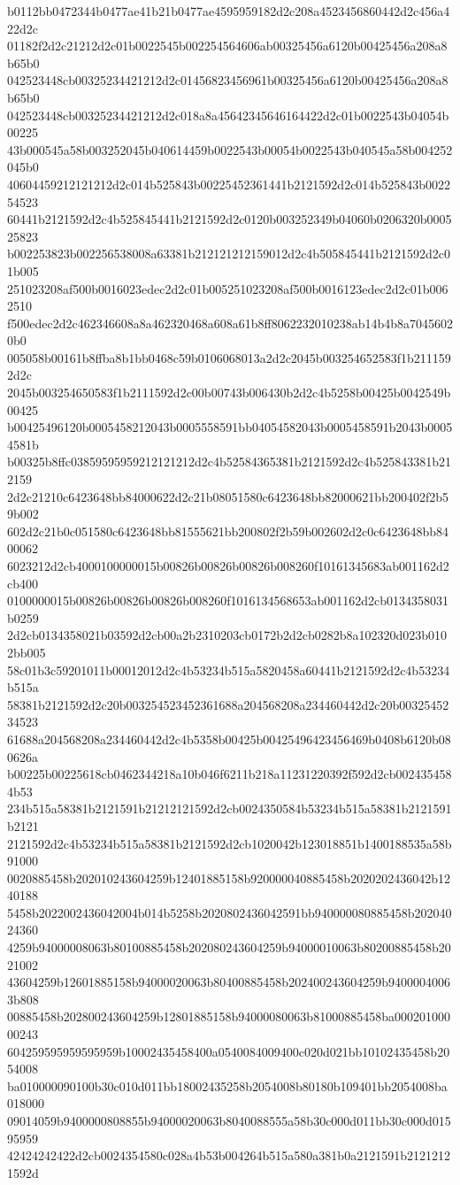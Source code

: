 b0112bb0472344b0477ae41b21b0477ae4595959182d2c208a4523456860442d2c456a422d2c
01182f2d2c21212d2c01b0022545b002254564606ab00325456a6120b00425456a208a8b65b0
042523448cb00325234421212d2c01456823456961b00325456a6120b00425456a208a8b65b0
042523448cb00325234421212d2c018a8a45642345646164422d2c01b0022543b04054b00225
43b000545a58b003252045b040614459b0022543b00054b0022543b040545a58b004252045b0
40604459212121212d2c014b525843b00225452361441b2121592d2c014b525843b002254523
60441b2121592d2c4b525845441b2121592d2c0120b003252349b04060b0206320b000525823
b002253823b002256538008a63381b212121212159012d2c4b505845441b2121592d2c01b005
251023208af500b0016023edec2d2c01b005251023208af500b0016123edec2d2c01b0062510
f500edec2d2c462346608a8a462320468a608a61b8ff8062232010238ab14b4b8a70456020b0
005058b00161b8ffba8b1bb0468c59b0106068013a2d2c2045b003254652583f1b2111592d2c
2045b003254650583f1b2111592d2c00b00743b006430b2d2c4b5258b00425b0042549b00425
b00425496120b0005458212043b0005558591bb04054582043b0005458591b2043b00054581b
b00325b8ffc03859595959212121212d2c4b52584365381b2121592d2c4b525843381b212159
2d2c21210c6423648bb84000622d2c21b08051580c6423648bb82000621bb200402f2b59b002
602d2c21b0c051580c6423648bb81555621bb200802f2b59b002602d2c0c6423648bb8400062
6023212d2cb4000100000015b00826b00826b00826b008260f10161345683ab001162d2cb400
0100000015b00826b00826b00826b008260f1016134568653ab001162d2cb0134358031b0259
2d2cb0134358021b03592d2cb00a2b2310203cb0172b2d2cb0282b8a102320d023b0102bb005
58c01b3c59201011b00012012d2c4b53234b515a5820458a60441b2121592d2c4b53234b515a
58381b2121592d2c20b003254523452361688a204568208a234460442d2c20b0032545234523
61688a204568208a234460442d2c4b5358b00425b00425496423456469b0408b6120b080626a
b00225b00225618cb0462344218a10b046f6211b218a11231220392f592d2cb0024354584b53
234b515a58381b2121591b21212121592d2cb0024350584b53234b515a58381b2121591b2121
2121592d2c4b53234b515a58381b2121592d2cb1020042b123018851b1400188535a58b91000
0020885458b202010243604259b12401885158b920000040885458b2020202436042b1240188
5458b2022002436042004b014b5258b2020802436042591bb940000080885458b20204024360
4259b94000008063b80100885458b202080243604259b94000010063b80200885458b2021002
43604259b12601885158b94000020063b80400885458b202400243604259b94000040063b808
00885458b202800243604259b12801885158b94000080063b81000885458ba00020100000243
604259595959595959b10002435458400a0540084009400c020d021bb10102435458b2054008
ba010000090100b30c010d011bb18002435258b2054008b80180b109401bb2054008ba018000
09014059b9400000808855b94000020063b8040088555a58b30c000d011bb30c000d01595959
42424242422d2cb0024354580c028a4b53b004264b515a580a381b0a2121591b21212121592d
